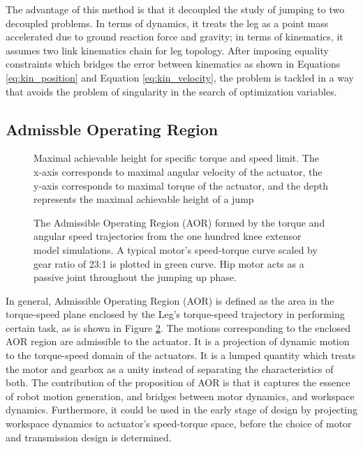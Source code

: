 The advantage of this method is that it decoupled the study of jumping to two decoupled problems. In terms of dynamics, it treats the leg as a point mass accelerated due to ground reaction force and gravity; in terms of kinematics, it assumes two link kinematics chain for leg topology. After imposing equality constraints which bridges the error between kinematics as shown in Equations \ref{eq:kin_position} and Equation \ref{eq:kin_velocity}, the problem is tackled in a way that avoids the problem of singularity in the search of optimization variables.


\subsection{Admissble Operating Region}
\label{sec:AOR}

\begin{figure}
	\centering
	\caption{Maximal achievable height for specific torque and speed limit. The x-axis corresponds to maximal angular velocity of the actuator, the y-axis corresponds to maximal torque of the actuator, and the depth represents the maximal achievable height of a jump}
	\label{fig:hmax_pcolor}
\end{figure}

\begin{figure}
	\centering
	\caption{The Admissible Operating Region (AOR) formed by the torque and angular speed trajectories from the one hundred knee extensor model simulations. A typical motor's speed-torque curve scaled by gear ratio of 23:1 is plotted in green curve. Hip motor acts as a passive joint throughout the jumping up phase.}
	\label{fig:AOR}
\end{figure}

 In general, Admissible Operating Region (AOR) is defined as the area in the torque-speed plane enclosed by the Leg's torque-speed trajectory in performing certain task, as is shown in Figure \ref{fig:AOR}. The motions corresponding to the enclosed AOR region are admissible to the actuator. It is a projection of dynamic motion to the torque-speed domain of the actuators. It is a lumped quantity which treats the motor and gearbox as a unity instead of separating the characteristics of both. The contribution of the proposition of AOR is that it captures the essence of robot motion generation, and bridges between motor dynamics, and workspace dynamics. Furthermore, it could be used in the early stage of design by projecting workspace dynamics to actuator's speed-torque space, before the choice of motor and transmission design is determined. 
 
